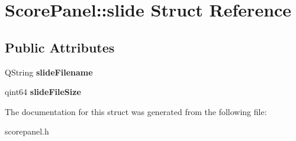 \hypertarget{structScorePanel_1_1slide}{}\section{Score\+Panel\+:\+:slide Struct Reference}
\label{structScorePanel_1_1slide}
\subsection*{Public Attributes}
\begin{DoxyCompactItemize}
\item 
\mbox{\label{structScorePanel_1_1slide_a35dcab18a82989c1e144397b717e1bf0}} 
Q\+String {\bfseries slide\+Filename}
\item 
\mbox{\label{structScorePanel_1_1slide_a962626bef70c44c3170d192fbc7e3de3}} 
qint64 {\bfseries slide\+File\+Size}
\end{DoxyCompactItemize}


The documentation for this struct was generated from the following file\+:\begin{DoxyCompactItemize}
\item 
scorepanel.\+h\end{DoxyCompactItemize}
